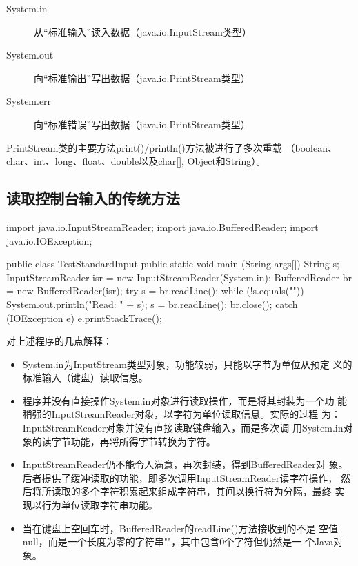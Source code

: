 \begin{description}\kai
\item [System.in] 从“标准输入”读入数据（java.io.InputStream类型）
\item [System.out] 向“标准输出”写出数据（java.io.PrintStream类型）
\item [System.err] 向“标准错误”写出数据（java.io.PrintStream类型）
\end{description}

PrintStream类的主要方法print()/println()方法被进行了多次重载
（boolean、char、int、long、float、double以及char[], Object和String）。

\subsection{读取控制台输入的传统方法}

\begin{javaCode}
  import java.io.InputStreamReader; 
  import java.io.BufferedReader; 
  import java.io.IOException;

  public class TestStandardInput {
    public static void main (String args[]) {
      String s;
      InputStreamReader isr = new InputStreamReader(System.in); 
      BufferedReader br = new BufferedReader(isr);
      try {
        s = br.readLine(); 
        while (!s.equals("")) {
          System.out.println("Read: " + s);
          s = br.readLine(); 
        }
        br.close();
      } catch (IOException e) {
        e.printStackTrace(); 
      }
    } 
  }  
\end{javaCode}

对上述程序的几点解释：

\begin{itemize}
\item System.in为InputStream类型对象，功能较弱，只能以字节为单位从预定
  义的标准输入（键盘）读取信息。
\item 程序并没有直接操作System.in对象进行读取操作，而是将其封装为一个功
  能稍强的InputStreamReader对象，以字符为单位读取信息。实际的过程
  为：{\kai InputStreamReader对象并没有直接读取键盘输入，而是多次调
    用System.in对象的读字节功能，再将所得字节转换为字符。}
\item InputStreamReader仍不能令人满意，再次封装，得到BufferedReader对
  象。后者提供了缓冲读取的功能，即多次调用InputStreamReader读字符操作，
  然后将所读取的多个字符积累起来组成字符串，其间以换行符为分隔，最终
  实现以行为单位读取字符串功能。
\item 当在键盘上空回车时，BufferedReader的readLine()方法接收到的不是
  空值null，而是一个长度为零的字符串""，其中包含0个字符但仍然是一
  个Java对象。
\end{itemize}

